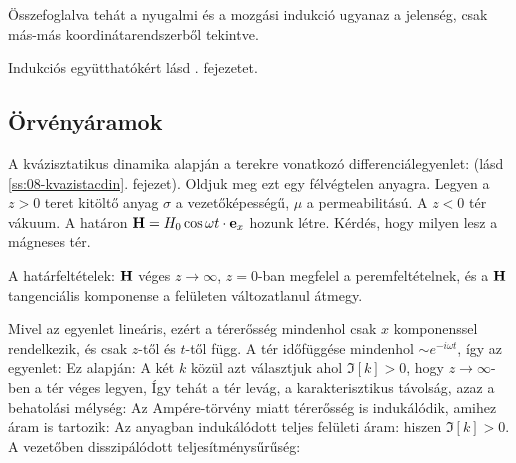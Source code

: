   Összefoglalva tehát a nyugalmi és a mozgási indukció ugyanaz a jelenség, csak más-más koordinátarendszerből tekintve.
  
  Indukciós együtthatókért lásd . fejezetet.
  
  
  \subsection{Örvényáramok}
   
   A kvázisztatikus dinamika alapján a terekre vonatkozó differenciálegyenlet:
   (lásd \ref{ss:08-kvazistacdin}. fejezet). Oldjuk meg ezt egy félvégtelen anyagra. Legyen a $z>0$ teret kitöltő anyag $\sigma$ a vezetőképességű, $\mu$ a permeabilitású. A $z<0$ tér vákuum. A határon $\mathbf{H}=H_0\cos\omega t\cdot \mathbf{e}_x$ hozunk létre. Kérdés, hogy milyen lesz a mágneses tér. 
   
   A határfeltételek: $\mathbf{H}$ véges $z\to\infty$, $z=0$-ban megfelel a peremfeltételnek, és a $\mathbf{H}$ tangenciális komponense a felületen változatlanul átmegy. 
   
   Mivel az egyenlet lineáris, ezért a térerősség mindenhol csak $x$ komponenssel rendelkezik, és csak $z$-től és $t$-től függ. A tér időfüggése mindenhol $\sim e^{-i\omega t}$, így az egyenlet:
   Ez alapján:
   A két $k$ közül azt választjuk ahol $\Im[k]>0$, hogy $z\to\infty$-ben a tér véges legyen, Így tehát a tér levág, a karakterisztikus távolság, azaz a behatolási mélység:
   Az Ampére-törvény miatt térerősség is indukálódik, amihez áram is tartozik:
   Az anyagban indukálódott teljes felületi áram:
   hiszen $\Im[k]>0$. A vezetőben disszipálódott teljesítménysűrűség:
   
   
   
   
   
